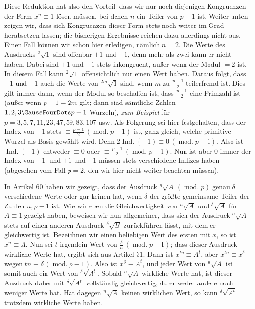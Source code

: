 Diese Reduktion hat also den Vorteil, dass wir nur noch diejenigen Kongruenzen der Form $x^n\equiv1$ lösen müssen, bei denen $n$ ein Teiler von $p-1$ ist. Weiter unten zeigen wir, dass sich Kongruenzen dieser Form stets noch weiter im Grad herabsetzen lassen; die bisherigen Ergebnisse reichen dazu allerdings nicht aus. Einen Fall können wir schon hier erledigen, nämlich $n=2$. Die Werte des Ausdrucks ${}^{2}\!\surd {1}$ sind offenbar $+1$ und $-1$, denn mehr als zwei kann er nicht haben. Dabei sind $+1$ und $-1$ stets inkongruent, außer wenn der Modul $=2$ ist. In diesem Fall kann ${}^{2}\!\surd {1}$ offensichtlich nur einen Wert haben. Daraus folgt, dass $+1$ und $-1$ auch die Werte von ${}^{2m}\!\surd {1}$ sind, wenn $m$ zu $\frac{p-1}{2}$ teilerfremd ist. Dies gilt immer dann, wenn der Modul so beschaffen ist, dass $\frac{p-1}{2}$ eine Primzahl ist (außer wenn $p-1=2m$ gilt; dann sind sämtliche Zahlen $1,2,3\GaussFourDots p-1$ Wurzeln), \emph{zum Beispiel} für $p=3,5,7,11,23,47,59,83,107$ usw. Als Folgerung sei hier festgehalten, dass der Index von $-1$ stets $\equiv\frac{p-1}{2}\,(\operatorname{mod.}p-1)$ ist, ganz gleich, welche primitive Wurzel als Basis gewählt wird. Denn $2\operatorname{Ind.}(-1)\equiv0\,(\operatorname{mod.}p-1)$. Also ist $\operatorname{Ind.}(-1)$ entweder $\equiv0$ oder $\equiv\frac{p-1}{2}\,(\operatorname{mod.}p-1)$. Nun ist aber $0$ immer der Index von $+1$, und $+1$ und $-1$ müssen stets verschiedene Indizes haben (abgesehen vom Fall $p=2$, den wir hier nicht weiter beachten müssen).

In Artikel 60 haben wir gezeigt, dass der Ausdruck ${}^{n}\!\surd {A}\,(\operatorname{mod.}p)$ genau $\delta$ verschiedene Werte oder gar keinen hat, wenn $\delta$ der größte gemeinsame Teiler der Zahlen $n,p-1$ ist. Wie wir eben die Gleichwertigkeit von ${}^{n}\!\surd {A}$ und ${}^{\delta}\!\surd {A}$ für $A\equiv1$ gezeigt haben, beweisen wir nun allgemeiner, dass sich der Ausdruck ${}^{n}\!\surd {A}$ stets auf einen anderen Ausdruck ${}^{\delta}\!\surd {B}$ zurückführen lässt, mit dem er gleichwertig ist. Bezeichnen wir einen beliebigen Wert des ersten mit $x$, so ist $x^n\equiv A$. Nun
sei $t$ irgendein Wert von $\frac{\delta}{n}\,(\operatorname{mod.}p-1)$; dass dieser Ausdruck wirkliche Werte hat, ergibt sich aus Artikel 31. Dann ist $x^{tn}\equiv A^t$, aber $x^{tn}\equiv x^\delta$ wegen $tn\equiv\delta\,(\operatorname{mod.}p-1)$. Also ist $x^\delta\equiv A^t$, und jeder Wert von ${}^{n}\!\surd {A}$ ist somit auch ein Wert von ${}^{\delta}\!\surd {A^t}$. Sobald ${}^{n}\!\surd {A}$ wirkliche Werte hat, ist dieser Ausdruck daher mit ${}^{\delta}\!\surd {A^t}$ vollständig gleichwertig, da er weder andere noch weniger Werte hat. Hat dagegen ${}^{n}\!\surd {A}$ keinen wirklichen Wert, so kann ${}^{\delta}\!\surd {A^t}$ trotzdem wirkliche Werte haben.

